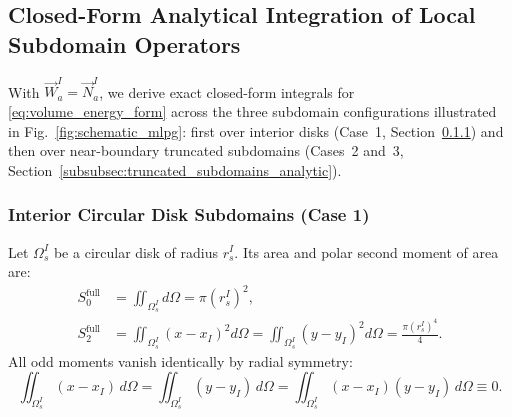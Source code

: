 \documentclass[VANCOUVER]{USG}
\begin{document}
\subsection{Closed-Form Analytical Integration of Local Subdomain Operators}
\label{subsec:analytic_formulas}

With $\vec{W}_a^I = \vec{N}_a^I$, we derive exact closed-form integrals for \eqref{eq:volume_energy_form} across the three subdomain configurations illustrated in Fig.~\ref{fig:schematic_mlpg}: first over interior disks (Case~1, Section~\ref{subsubsec:interior_disk_analytic}) and then over near-boundary truncated subdomains (Cases~2 and~3, Section~\ref{subsubsec:truncated_subdomains_analytic}).

\subsubsection{Interior Circular Disk Subdomains (Case 1)}
\label{subsubsec:interior_disk_analytic}

Let $\Omega_s^I$ be a circular disk of radius $r_s^I$. Its area and polar second moment of area are:
\begin{equation}
    \begin{aligned}
        S_0^{\mathrm{full}} & = \iint_{\Omega_s^I} d\Omega = \pi (r_s^I)^2,                                                                \\
        S_2^{\mathrm{full}} & = \iint_{\Omega_s^I} (x - x_I)^2 d\Omega = \iint_{\Omega_s^I} (y - y_I)^2 d\Omega = \frac{\pi (r_s^I)^4}{4}.
    \end{aligned}
    \label{eq:disk_moments}
\end{equation}
All odd moments vanish identically by radial symmetry:
\begin{equation}
    \iint_{\Omega_s^I} (x - x_I) \, d\Omega = \iint_{\Omega_s^I} (y - y_I) \, d\Omega = \iint_{\Omega_s^I} (x - x_I)(y - y_I) \, d\Omega \equiv 0.
\end{equation}
\end{document}
